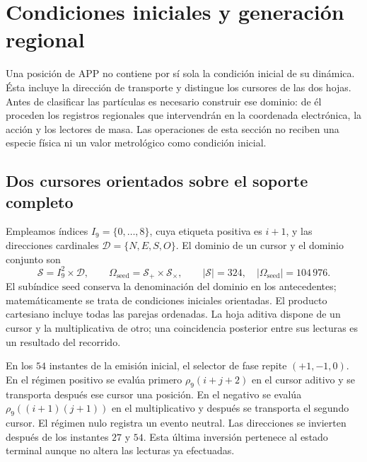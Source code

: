 \section{Condiciones iniciales y generación regional}
\label{vi:vi:reg:seccion}\label{vi:sec:extension}\label{vi:sec:generacion}

Una posición de APP no contiene por sí sola la condición inicial de su
dinámica. Ésta incluye la dirección de transporte y distingue los cursores
de las dos hojas. Antes de clasificar las partículas es necesario
construir ese dominio: de él proceden los registros regionales que
intervendrán en la coordenada electrónica, la acción y los lectores de
masa. Las operaciones de esta sección no reciben una especie física ni
un valor metrológico como condición inicial.

\subsection{Dos cursores orientados sobre el soporte completo}

Empleamos índices \(I_9=\{0,\ldots,8\}\), cuya etiqueta positiva es
\(i+1\), y las direcciones cardinales \(\mathcal D=\{N,E,S,O\}\).
El dominio de un cursor y el dominio conjunto son
\begin{equation}
 \mathcal S=I_9^2\times\mathcal D,\qquad
 \Omega_{\mathrm{seed}}=\mathcal S_+\times\mathcal S_\times,
 \qquad |\mathcal S|=324,\quad
 |\Omega_{\mathrm{seed}}|=104\,976.
 \label{vi:eq:semillas}
\end{equation}
El subíndice \(\mathrm{seed}\) conserva la denominación del dominio en
los antecedentes; matemáticamente se trata de condiciones iniciales
orientadas. El producto cartesiano incluye todas las parejas ordenadas.
La hoja aditiva dispone de un cursor y la multiplicativa de otro; una
coincidencia posterior entre sus lecturas es un resultado del recorrido.

En los \(54\) instantes de la emisión inicial, el selector de fase
repite \((+1,-1,0)\). En el régimen positivo se evalúa primero
\(\rho_9(i+j+2)\) en el cursor aditivo y se transporta después ese
cursor una posición. En el negativo se evalúa
\(\rho_9((i+1)(j+1))\) en el multiplicativo y después se transporta
el segundo cursor. El régimen nulo registra un evento neutral. Las
direcciones se invierten después de los instantes \(27\) y \(54\).
Esta última inversión pertenece al estado terminal aunque no altera
las lecturas ya efectuadas.

